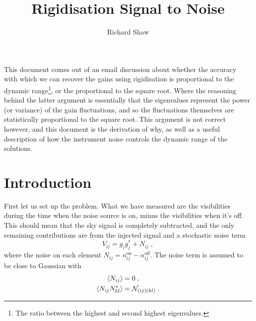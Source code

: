 \documentclass[oldfontcommands,letter,11pt,oneside,article]{memoir}
\begin{document}
\title{Rigidisation Signal to Noise}
\author{Richard Shaw}

\maketitle

This document comes out of an email discussion about whether the accuracy with
which we can recover the gains using rigidisation is proportional to the
dynamic range\footnote{The ratio between the highest and second highest
eigenvalues.}, or the proportional to the square root. Where the reasoning
behind the latter argument is essentially that the eigenvalues represent the
power (or variance) of the gain fluctuations, and so the fluctuations
themselves are statistically proportional to the square root. This argument is
not correct however, and this document is the derivation of why, as well as a
useful description of how the instrument noise controls the dynamic range of
the solutions.

\section*{Introduction}

First let us set up the problem. What we have measured are the visibilities
during the time when the noise source is on, minus the visibilities when it's
off. This should mean that the sky signal is completely subtracted, and the only
remaining contributions are from the injected signal and a stochastic noise term
\begin{equation}
\label{eq:gain}
V_{ij} = g_i g_j^* + N_{ij} \; ,
\end{equation}
where the noise on each element $N_{ij} = n_{ij}^\text{on} - n_{ij}^\text{off}$. The noise
term is assumed to be close to Gaussian with
\begin{subequations}
\begin{align}
\label{eq:noise_stats}
\left\langle N_{ij} \right\rangle & = 0 \; , \\
\left\langle N_{ij} N_{kl}^* \right\rangle & = \mathcal{N}_{(ij)(kl)}\; .
\end{align}
\end{subequations}
\end{document}
